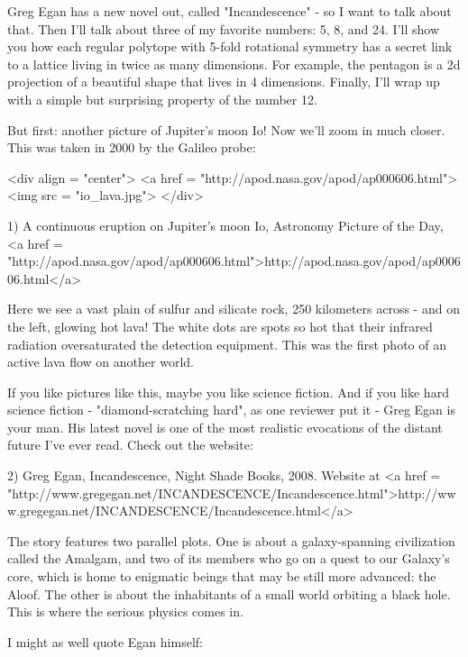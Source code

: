 

Greg Egan has a new novel out, called "Incandescence" - so I want to 
talk about that.  Then I'll talk about three of my favorite numbers: 
5, 8, and 24.  I'll show you how each regular polytope with 5-fold 
rotational symmetry has a secret link to a lattice living in twice 
as many dimensions.  For example, the pentagon is a 2d projection of 
a beautiful shape that lives in 4 dimensions.  Finally, I'll wrap up 
with a simple but surprising property of the number 12. 

But first: another picture of Jupiter's moon Io!  Now we'll zoom in
much closer.  This was taken
in 2000 by the Galileo probe:


<div align = "center">
<a href = "http://apod.nasa.gov/apod/ap000606.html">
<img src = "io_lava.jpg">
</div>

1) A continuous eruption on Jupiter's moon Io, Astronomy Picture 
of the Day, <a href = "http://apod.nasa.gov/apod/ap000606.html">http://apod.nasa.gov/apod/ap000606.html</a>

Here we see a vast plain of sulfur and silicate rock, 250 kilometers
across - and on the left, glowing hot lava!  The white dots are 
spots so hot that their infrared radiation oversaturated the detection
equipment.  This was the first photo of an active lava flow on another
world.  

If you like pictures like this, maybe you like science fiction.  And
if you like hard science fiction - "diamond-scratching
hard", as one reviewer put it - Greg Egan is your man.  His
latest novel is one of the most realistic evocations of the distant
future I've ever read.  Check out the website:

2) Greg Egan, Incandescence, Night Shade Books, 2008.
Website at <a href = "http://www.gregegan.net/INCANDESCENCE/Incandescence.html">http://www.gregegan.net/INCANDESCENCE/Incandescence.html</a>

The story features two parallel plots.  One is about a galaxy-spanning 
civilization called the Amalgam, and two of its members who go on a 
quest to our Galaxy's core, which is home to enigmatic beings that 
may be still more advanced: the Aloof.  The other is about the 
inhabitants of a small world orbiting a black hole.  This is where 
the serious physics comes in.  

I might as well quote Egan himself:

